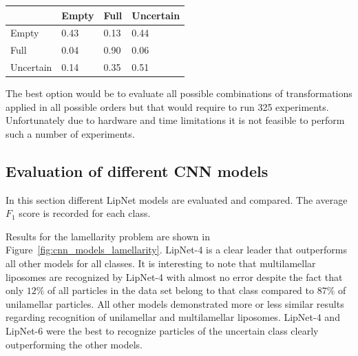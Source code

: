 \documentclass[a4paper, 11pt, table]{article}
\begin{document}
\begin{center}
\label{table:zoom_only}
\begin{tabular}{|L{2.5cm} |C{2.5cm} |C{2.5cm} |C{2.5cm}|}
\toprule
 & Empty & Full & Uncertain \\
\midrule
Empty & 0.43 & 0.13 & 0.44 \\
Full & 0.04 & 0.90 & 0.06 \\
Uncertain & 0.14 & 0.35 & 0.51 \\
\bottomrule
\end{tabular}
\end{center}

The best option would be to evaluate all possible combinations of transformations applied in all possible orders but that would require to run 325 experiments. Unfortunately due to hardware and time limitations it is not feasible to perform such a number of experiments.

\subsection{Evaluation of different CNN models}

In this section different LipNet models are evaluated and compared. The average $F_1$ score is recorded for each class.

Results for the lamellarity problem are shown in Figure~\ref{fig:cnn_models_lamellarity}. LipNet-4 is a clear leader that outperforms all other models for all classes. It is interesting to note that multilamellar liposomes are recognized by LipNet-4 with almost no error despite the fact that only $12\%$ of all particles in the data set belong to that class compared to $87\%$ of unilamellar particles. All other models demonstrated more or less similar results regarding recognition of unilamellar and multilamellar liposomes. LipNet-4 and LipNet-6 were the best to recognize particles of the uncertain class clearly outperforming the other models.
\end{document}
